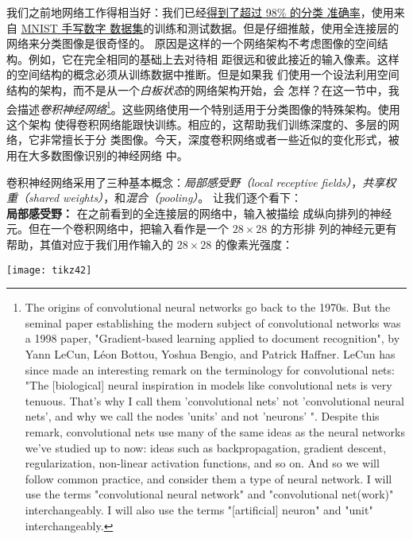 我们之前地网络工作得相当好：我们已经\hyperref[98percent]{得到了超过 98\% 的分类
  准确率}，使用来自 \hyperref[sec:learning_with_gradient_descent]{MNIST 手写数字
  数据集}的训练和测试数据。但是仔细推敲，使用全连接层的网络来分类图像是很奇怪的。
原因是这样的一个网络架构不考虑图像的空间结构。例如，它在完全相同的基础上去对待相
距很远和彼此接近的输入像素。这样的空间结构的概念必须从训练数据中推断。但是如果我
们使用一个设法利用空间结构的架构，而不是从一个\emph{白板状态}的网络架构开始，会
怎样？在这一节中，我会描述\emph{卷积神经网络}\footnote{The
  origins of convolutional neural networks go back to the 1970s. But the seminal
  paper establishing the modern subject of convolutional networks was a 1998
  paper, "Gradient-based learning applied to document recognition", by Yann
  LeCun, Léon Bottou, Yoshua Bengio, and Patrick Haffner. LeCun has since made
  an interesting remark on the terminology for convolutional nets: "The
  [biological] neural inspiration in models like convolutional nets is very
  tenuous. That's why I call them 'convolutional nets' not 'convolutional neural
  nets', and why we call the nodes 'units' and not 'neurons' ". Despite this
  remark, convolutional nets use many of the same ideas as the neural networks
  we've studied up to now: ideas such as backpropagation, gradient descent,
  regularization, non-linear activation functions, and so on. And so we will
  follow common practice, and consider them a type of neural network. I will use
  the terms "convolutional neural network" and "convolutional net(work)"
  interchangeably. I will also use the terms "[artificial] neuron" and "unit"
  interchangeably.}。这些网络使用一个特别适用于分类图像的特殊架构。使用这个架构
使得卷积网络能跟快训练。相应的，这帮助我们训练深度的、多层的网络，它非常擅长于分
类图像。今天，深度卷积网络或者一些近似的变化形式，被用在大多数图像识别的神经网络
中。

卷积神经网络采用了三种基本概念：\emph{局部感受野（local receptive
    fields）}，\emph{共享权重（shared
    weights）}，和\emph{混合（pooling）}。
让我们逐个看下：\\

\textbf{局部感受野：} 在之前看到的全连接层的网络中，输入被描绘
成纵向排列的神经元。但在一个卷积网络中，把输入看作是一个 $28 \times 28$ 的方形排
列的神经元更有帮助，其值对应于我们用作输入的 $28 \times 28$ 的像素光强度：
\begin{center}
  \texttt{[image: tikz42]}
\end{center}

